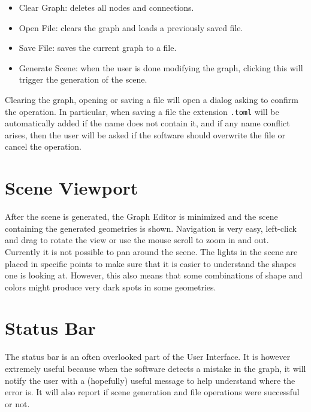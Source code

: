 \begin{itemize}
    \item Clear Graph: deletes all nodes and connections.
    \item Open File: clears the graph and loads a previously saved file.
    \item Save File: saves the current graph to a file.
    \item Generate Scene: when the user is done modifying the graph, clicking this
        will trigger the generation of the scene.
\end{itemize}

Clearing the graph, opening or saving a file will open a dialog asking to confirm the operation.
In particular, when saving a file the extension \texttt{.toml} will be automatically added if
the name does not contain it, and if any name conflict arises, then the user will be asked if
the software should overwrite the file or cancel the operation.

\section{Scene Viewport}

After the scene is generated, the Graph Editor is minimized and the scene containing the generated
geometries is shown. Navigation is very easy, left-click and drag to rotate the view or use
the mouse scroll to zoom in and out. Currently it is not possible to pan around the scene.
The lights in the scene are placed in specific points to make sure that it is easier to understand
the shapes one is looking at. However, this also means that some combinations of shape and colors
might produce very dark spots in some geometries.

\section{Status Bar}

The status bar is an often overlooked part of the User Interface. It is however extremely useful
because when the software detects a mistake in the graph, it will notify the user
with a (hopefully) useful message to help understand where the error is.
It will also report if scene generation and file operations were successful or not.


